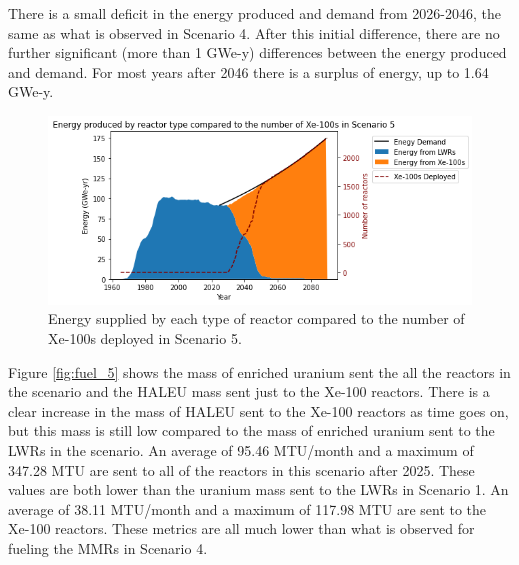 There is a small deficit in the energy produced and demand from 
2026-2046, the same as what is observed in Scenario 4. After this 
initial difference, there are no further significant (more than 
1 GWe-y) differences between 
the energy produced and demand. For most years after 2046 there 
is a surplus of energy, up to 1.64 GWe-y. 

\begin{figure}
    \centering 
    \includegraphics[width=\textwidth]{../figures/energy_scenario5.png}
    \caption{Energy supplied by each type of reactor compared to the number of 
    Xe-100s deployed in Scenario 5.}
    \label{fig:energy_rx_5}
\end{figure}

Figure \ref{fig:fuel_5} shows the mass of enriched uranium sent the all  
the reactors in the scenario and the \gls{HALEU} mass sent just to the 
Xe-100 reactors. There is a clear increase in the mass of \gls{HALEU} sent 
to the Xe-100 reactors as time goes on, but this mass is still  
low compared to the mass of enriched uranium sent to the \glspl{LWR} in 
the scenario. An average of 95.46 MTU/month and a maximum of 347.28 MTU 
are sent to all of the reactors in this scenario after 2025. These 
values are both lower than the uranium mass sent to the 
\glspl{LWR} in Scenario 1. An average of 
38.11 MTU/month and a maximum of 117.98 MTU are sent to the Xe-100 reactors. 
These metrics are all much lower than what is observed 
for fueling the \glspl{MMR} in Scenario 4.


